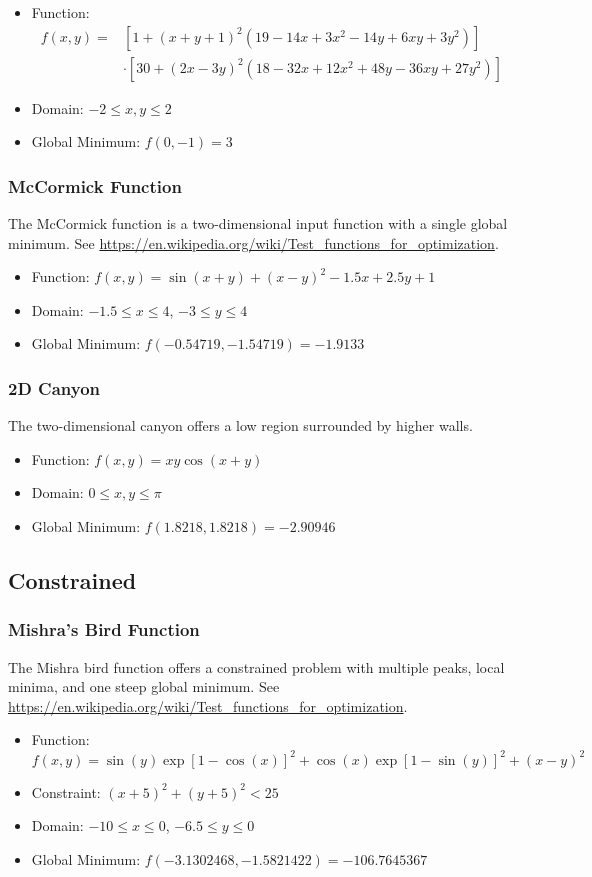 \begin{itemize}
  \item Function:
    \begin{align}
      f(x,y) =& \left[1+(x+y+1)^2\left(19-14x+3x^2-14y+6xy+3y^2\right)\right] \\ \nonumber
        & \cdot\left[30+(2x-3y)^2(18-32x+12x^2+48y-36xy+27y^2)\right]
    \end{align}
  \item Domain: $-2 \leq x,y \leq 2$
  \item Global Minimum: $f(0,-1)=3$
\end{itemize}

\subsubsection{McCormick Function}
The McCormick function is a two-dimensional input function with a single global minimum.
See \url{https://en.wikipedia.org/wiki/Test_functions_for_optimization}.

\begin{itemize}
  \item Function: $f(x,y) = \sin(x+y) + (x-y)^2 - 1.5x + 2.5y + 1$
  \item Domain: $-1.5 \leq x \leq 4$, $-3 \leq y \leq 4$
  \item Global Minimum: $f(-0.54719,-1.54719) = -1.9133$
\end{itemize}


\subsubsection{2D Canyon}
The two-dimensional canyon offers a low region surrounded by higher walls.

\begin{itemize}
  \item Function: $f(x,y) = xy\cos(x+y)$
  \item Domain: $0 \leq x,y \leq \pi$
  \item Global Minimum: $f(1.8218,1.8218)=-2.90946$
\end{itemize}



\subsection{Constrained}
\subsubsection{Mishra's Bird Function}
The Mishra bird function offers a constrained problem with multiple peaks, local minima, and one steep global
minimum.
See \url{https://en.wikipedia.org/wiki/Test_functions_for_optimization}.

\begin{itemize}
  \item Function: $f(x,y) = \sin(y)\exp[1-\cos(x)]^2 + \cos(x)\exp[1-\sin(y)]^2 + (x-y)^2$
  \item Constraint: $(x+5)^2 + (y+5)^2 < 25$
  \item Domain: $-10 \leq x \leq 0$, $-6.5 \leq y \leq 0$
  \item Global Minimum: $f(-3.1302468, -1.5821422) = -106.7645367$
\end{itemize}

